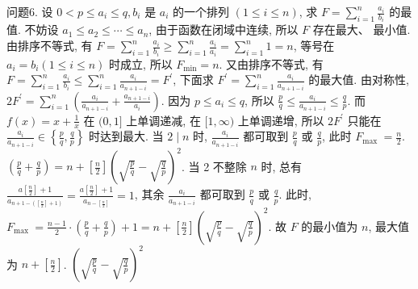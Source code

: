 问题6. 设 $0<p \leqslant a_i \leqslant q, b_i$ 是 $a_i$ 的一个排列 $(1 \leqslant i \leqslant n)$, 求 $F=\sum_{i=1}^n \frac{a_i}{b_i}$ 的最值.
不妨设 $a_1 \leqslant a_2 \leqslant \cdots \leqslant a_n$, 由于函数在闭域中连续, 所以 $F$ 存在最大、 最小值.
由排序不等式, 有 $F=\sum_{i=1}^n \frac{a_i}{b_i} \geqslant \sum_{i=1}^n \frac{a_i}{a_i}=\sum_{i=1}^n 1=n$, 等号在 $a_i= b_i(1 \leqslant i \leqslant n)$ 时成立, 所以 $F_{\min }=n$. 又由排序不等式, 有 $F=\sum_{i=1}^n \frac{a_i}{b_i} \leqslant \sum_{i=1}^n \frac{a_i}{a_{n+1-i}}=F^{\prime}$, 下面求 $F^{\prime}=\sum_{i=1}^n \frac{a_i}{a_{n+1-i}}$ 的最大值.
由对称性, $2 F^{\prime}= \sum_{i=1}^n\left(\frac{a_i}{a_{n+1-i}}+\frac{a_{n+1-i}}{a_i}\right)$. 因为 $p \leqslant a_i \leqslant q$, 所以 $\frac{p}{q} \leqslant \frac{a_i}{a_{n+1-i}} \leqslant \frac{q}{p}$. 而 $f(x)=x+\frac{1}{x}$ 在 $(0,1]$ 上单调递减, 在 $[1, \infty)$ 上单调递增, 所以 $2 F^{\prime}$ 只能在 $\frac{a_i}{a_{n+1-i}} \in \left\{\frac{p}{q}, \frac{q}{p}\right\}$ 时达到最大.
当 $2 \mid n$ 时, $\frac{a_i}{a_{n+1-i}}$ 都可取到 $\frac{p}{q}$ 或 $\frac{q}{p}$, 此时 $F_{\text {max }}=\frac{n}{2}$. $\left(\frac{p}{q}+\frac{q}{p}\right)=n+\left[\frac{n}{2}\right]\left(\sqrt{\frac{p}{q}}-\sqrt{\frac{q}{p}}\right)^2$. 当 2 不整除 $n$ 时, 总有 $\frac{a\left[\frac{n}{2}\right]+1}{a_{n+1-\left(\left[\frac{n}{2}\right]+1\right)}}= \frac{a\left[\frac{n}{2}\right]+1}{a_{n-\left[\frac{n}{2}\right]}}=1$, 其余 $\frac{a_i}{a_{n+1-i}}$ 都可取到 $\frac{p}{q}$ 或 $\frac{q}{p}$. 此时, $F_{\text {max }}=\frac{n-1}{2} \cdot\left(\frac{p}{q}+\frac{q}{p}\right)+ 1=n+\left[\frac{n}{2}\right]\left(\sqrt{\frac{p}{q}}-\sqrt{\frac{q}{p}}\right)^2$. 故 $F$ 的最小值为 $n$, 最大值为 $n+\left[\frac{n}{2}\right]$. $\left(\sqrt{\frac{p}{q}}-\sqrt{\frac{q}{p}}\right)^2$


